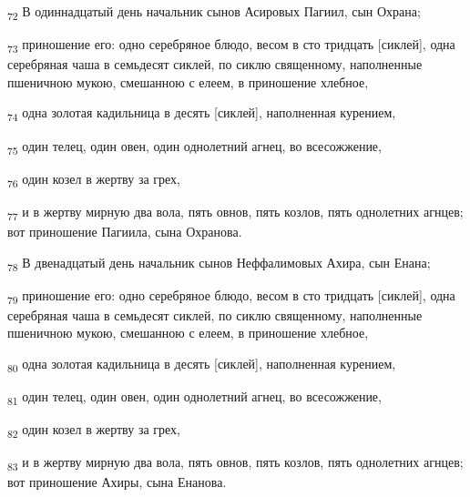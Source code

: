 \begin{tcolorbox}
\textsubscript{72} В одиннадцатый день начальник сынов Асировых Пагиил, сын Охрана;
\end{tcolorbox}
\begin{tcolorbox}
\textsubscript{73} приношение его: одно серебряное блюдо, весом в сто тридцать [сиклей], одна серебряная чаша в семьдесят сиклей, по сиклю священному, наполненные пшеничною мукою, смешанною с елеем, в приношение хлебное,
\end{tcolorbox}
\begin{tcolorbox}
\textsubscript{74} одна золотая кадильница в десять [сиклей], наполненная курением,
\end{tcolorbox}
\begin{tcolorbox}
\textsubscript{75} один телец, один овен, один однолетний агнец, во всесожжение,
\end{tcolorbox}
\begin{tcolorbox}
\textsubscript{76} один козел в жертву за грех,
\end{tcolorbox}
\begin{tcolorbox}
\textsubscript{77} и в жертву мирную два вола, пять овнов, пять козлов, пять однолетних агнцев; вот приношение Пагиила, сына Охранова.
\end{tcolorbox}
\begin{tcolorbox}
\textsubscript{78} В двенадцатый день начальник сынов Неффалимовых Ахира, сын Енана;
\end{tcolorbox}
\begin{tcolorbox}
\textsubscript{79} приношение его: одно серебряное блюдо, весом в сто тридцать [сиклей], одна серебряная чаша в семьдесят сиклей, по сиклю священному, наполненные пшеничною мукою, смешанною с елеем, в приношение хлебное,
\end{tcolorbox}
\begin{tcolorbox}
\textsubscript{80} одна золотая кадильница в десять [сиклей], наполненная курением,
\end{tcolorbox}
\begin{tcolorbox}
\textsubscript{81} один телец, один овен, один однолетний агнец, во всесожжение,
\end{tcolorbox}
\begin{tcolorbox}
\textsubscript{82} один козел в жертву за грех,
\end{tcolorbox}
\begin{tcolorbox}
\textsubscript{83} и в жертву мирную два вола, пять овнов, пять козлов, пять однолетних агнцев; вот приношение Ахиры, сына Енанова.
\end{tcolorbox}
